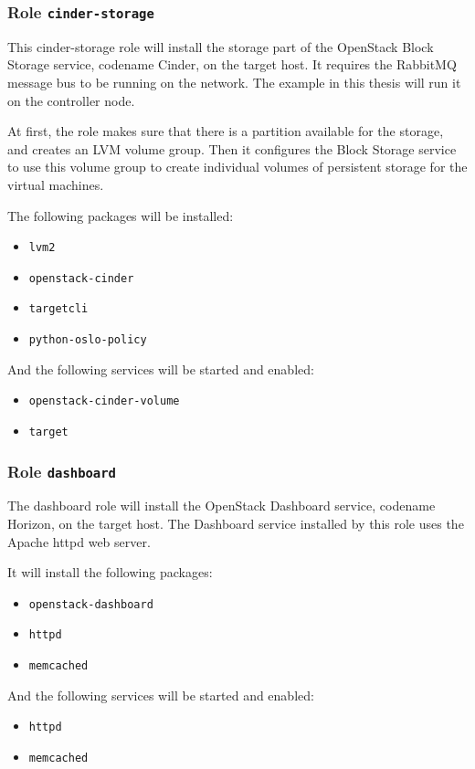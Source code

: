\subsubsection*{Role \texttt{cinder-storage}}

This cinder-storage role will install the storage part of the OpenStack Block Storage service, codename Cinder, on the target host. It requires the RabbitMQ message bus to be running on the network. The example in this thesis will run it on the controller node.

At first, the role makes sure that there is a partition available for the storage, and creates an LVM volume group. Then it configures the Block Storage service to use this volume group to create individual volumes of persistent storage for the virtual machines.

The following packages will be installed:

\begin{itemize}
  \item{\texttt{lvm2}}
  \item{\texttt{openstack-cinder}}
  \item{\texttt{targetcli}}
  \item{\texttt{python-oslo-policy}}
\end{itemize}

And the following services will be started and enabled:

\begin{itemize}
  \item{\texttt{openstack-cinder-volume}}
  \item{\texttt{target}}
\end{itemize}



\subsubsection*{Role \texttt{dashboard}}
The dashboard role will install the OpenStack Dashboard service, codename Horizon, on the target host. The Dashboard service installed by this role uses the Apache httpd web server.

It will install the following packages:
\begin{itemize}
  \item{\texttt{openstack-dashboard}}
  \item{\texttt{httpd}}
  \item{\texttt{memcached}}
\end{itemize}
And the following services will be started and enabled:
\begin{itemize}
  \item{\texttt{httpd}}
  \item{\texttt{memcached}}
\end{itemize}




